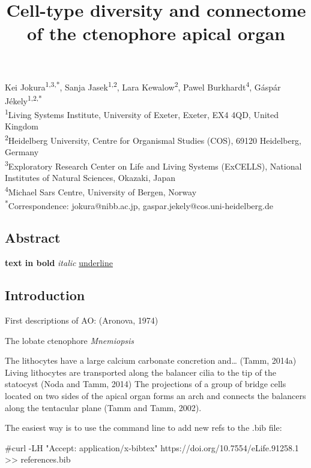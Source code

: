 \documentclass[
  11pt,
]{article}
\title{Cell-type diversity and connectome of the ctenophore apical
organ}
\author{}
\date{}
\newenvironment{Shaded}{\begin{snugshade}}{\end{snugshade}}
\newcommand{\CommentTok}[1]{\textcolor[rgb]{0.37,0.37,0.37}{#1}}
\begin{document}
\maketitle

\linenumbers

\hfill\break

Kei Jokura\textsuperscript{1,3,*}, Sanja Jasek\textsuperscript{1,2},
Lara Kewalow\textsuperscript{2}, Pawel Burkhardt\textsuperscript{4},
Gáspár Jékely\textsuperscript{1,2,*}\\

\textsuperscript{1}Living Systems Institute, University of Exeter,
Exeter, EX4 4QD, United Kingdom\\
\textsuperscript{2}Heidelberg University, Centre for Organismal Studies
(COS), 69120 Heidelberg, Germany\\
\textsuperscript{3}Exploratory Research Center on Life and Living
Systems (ExCELLS), National Institutes of Natural Sciences, Okazaki,
Japan\\
\textsuperscript{4}Michael Sars Centre, University of Bergen, Norway\\
\textsuperscript{*}Correspondence: jokura@nibb.ac.jp,
gaspar.jekely@cos.uni-heidelberg.de

\subsection{Abstract}\label{abstract}

\textbf{text in bold} \emph{italic} \ul{underline}

\subsection{Introduction}\label{introduction}

First descriptions of AO: (Aronova, 1974)

The lobate ctenophore \emph{Mnemiopsis}

The lithocytes have a large calcium carbonate concretion and\ldots{}
(Tamm, 2014a) Living lithocytes are transported along the balancer cilia
to the tip of the statocyst (Noda and Tamm, 2014) The projections of a
group of bridge cells located on two sides of the apical organ forms an
arch and connects the balancers along the tentacular plane (Tamm and
Tamm, 2002).

The easiest way is to use the command line to add new refs to the .bib
file:

\begin{Shaded}
\begin{Highlighting}[]
\CommentTok{\#curl {-}LH "Accept: application/x{-}bibtex" https://doi.org/10.7554/eLife.91258.1 \textgreater{}\textgreater{} references.bib}
\end{Highlighting}
\end{Shaded}
\end{document}
